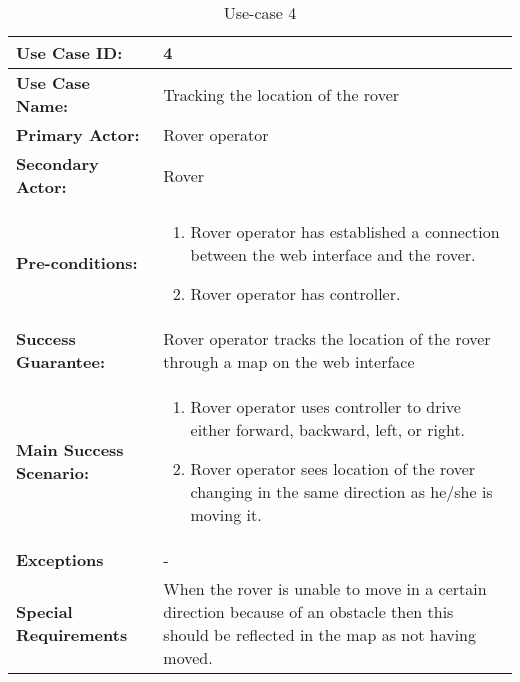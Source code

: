 \documentclass[12pt]{article}
\begin{document}
	 	\begin{table}[h]
	 		\centering
	 		\begin{tabularx}{\linewidth}{|X|X|}
	 			\hline
	 			\textbf{Use Case ID:} &4\\
	 			\hline
	 			\textbf{Use Case Name:} &Tracking the location of the rover\\
	 			\hline
	 			\textbf{Primary Actor:} &Rover operator\\
	 			\hline
	 			\textbf{Secondary Actor:} &Rover\\
	 			\hline
	 			\textbf{Pre-conditions:} &\begin{enumerate}
	 				\item Rover operator has established a connection between the web interface and the rover.
	 				\item Rover operator has controller.
	 			\end{enumerate}\\
	 			\hline
	 			\textbf{Success Guarantee:} &
	 			Rover operator tracks the location of the rover through a map on the web interface \\
	 			\hline 
	 			\textbf{Main Success Scenario:} &\begin{enumerate}
	 				\item Rover operator uses controller to drive either forward, backward, left, or right.
	 				\item Rover operator sees location of the rover changing in the same direction as he/she is moving it.
	 			\end{enumerate}\\
	 			\hline
	 			\textbf{Exceptions} &-\\
	 			\hline
	 			\textbf{Special Requirements} &When the rover is unable to move in a certain direction because of an obstacle then this should be reflected in the map as not having moved. \\
	 			\hline
	 		\end{tabularx}
	 		\caption{Use-case 4}
	 		\label{table:Use-case4}   
	 	\end{table}
\end{document}
